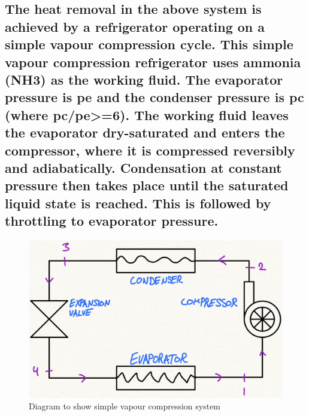\documentclass[12pt]{article}
\numberwithin{equation}{section}
\begin{document}
\begin{flushleft}
\subsection[SVCC Refrigerator.]{The heat removal in the above system is achieved by a refrigerator operating on a simple vapour compression cycle. This simple vapour compression refrigerator uses ammonia (NH3) as the working fluid. The evaporator pressure is pe and the condenser pressure is pc (where pc/pe>=6). The working fluid leaves the evaporator dry-saturated and enters the compressor, where it is compressed reversibly and adiabatically. Condensation at constant pressure then takes place until the saturated liquid state is reached. This is followed by throttling to evaporator pressure.}
\begin{figure}[H]
  \centering
  \includegraphics[width  = \textwidth]{./img/SystemDiagram63.png}
  \caption{Diagram to show simple vapour compression system}
\end{figure}

\end{flushleft}
\end{document}
